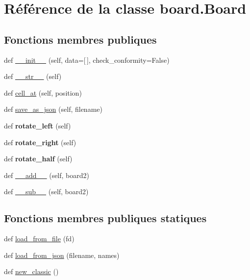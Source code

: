 \hypertarget{classboard_1_1Board}{}\section{Référence de la classe board.\+Board}
\label{classboard_1_1Board}
\subsection*{Fonctions membres publiques}
\begin{DoxyCompactItemize}
\item 
def \hyperlink{classboard_1_1Board_a85c5ad518a95fb8f9bdee5969cd28c7a}{\+\_\+\+\_\+init\+\_\+\+\_\+} (self, data=\mbox{[}$\,$\mbox{]}, check\+\_\+conformity=False)
\item 
def \hyperlink{classboard_1_1Board_a250139b957b679637dcdd946e752f8c3}{\+\_\+\+\_\+str\+\_\+\+\_\+} (self)
\item 
def \hyperlink{classboard_1_1Board_a8cf058b5192a359f7312cd7c3fe11035}{cell\+\_\+at} (self, position)
\item 
def \hyperlink{classboard_1_1Board_aa8ced227328068a4365e0709d3563067}{save\+\_\+as\+\_\+json} (self, filename)
\item 
\mbox{\label{classboard_1_1Board_a6971cd0ffcd3a08be6c7fd5e7f6e25e5}} 
def {\bfseries rotate\+\_\+left} (self)
\item 
\mbox{\label{classboard_1_1Board_a9f02a746cb77d96c423d24546a426a06}} 
def {\bfseries rotate\+\_\+right} (self)
\item 
\mbox{\label{classboard_1_1Board_abdefe196a82774f5b55ac54582fc9356}} 
def {\bfseries rotate\+\_\+half} (self)
\item 
def \hyperlink{classboard_1_1Board_abd162106bb4e4227679ed4ae5176f487}{\+\_\+\+\_\+add\+\_\+\+\_\+} (self, board2)
\item 
def \hyperlink{classboard_1_1Board_ab70bf2990045428534f01b124a50c013}{\+\_\+\+\_\+sub\+\_\+\+\_\+} (self, board2)
\end{DoxyCompactItemize}
\subsection*{Fonctions membres publiques statiques}
\begin{DoxyCompactItemize}
\item 
def \hyperlink{classboard_1_1Board_a9091b4a3885f23c5177caa1b39f8abcd}{load\+\_\+from\+\_\+file} (fd)
\item 
def \hyperlink{classboard_1_1Board_a6c8cc235162403c41d7a6b1ee9bb4fd7}{load\+\_\+from\+\_\+json} (filename, names)
\item 
def \hyperlink{classboard_1_1Board_a91650ef03892e24f144d1adeb0e5addc}{new\+\_\+classic} ()
\end{DoxyCompactItemize}
